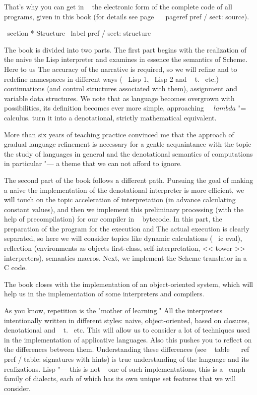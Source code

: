That's why you can get in ~ the electronic form of the complete code of all programs,
given in this book (for details see page ~ \ pageref {pref / sect: source}).


\ section * {Structure} \ label {pref / sect: structure}

The book is divided into two parts. The first part begins with the realization of the naive
the Lisp interpreter and examines in essence the semantics of Scheme. Here to us
The accuracy of the narrative is required, so we will refine and
to redefine namespaces in different ways ( \ Lisp 1, \ Lisp 2 and ~ t. \, etc.)
continuations (and control structures associated with them), assignment and
variable data structures. We note that as
language becomes overgrown with possibilities, its definition becomes ever more simple,
approaching ~ $ \ lambda $ "= calculus.
turn it into a denotational, strictly mathematical equivalent.

More than six years of teaching practice convinced me that
the approach of gradual language refinement is necessary for a gentle acquaintance with the topic
the study of languages ​​in general and the denotational semantics of computations in particular
"--- a theme that we can not afford to ignore.

The second part of the book follows a different path. Pursuing the goal of making a naive
the implementation of the denotational interpreter is more efficient, we will touch on the topic
acceleration of interpretation (in advance calculating constant values), and then
we implement this preliminary processing (with the help of precompilation) for our
compiler in ~ bytecode. In this part, the preparation of the program for the execution and
The actual execution is clearly separated, so here we will consider
topics like dynamic calculations ( \ ic {eval}), reflection (environments as objects
first-class, self-interpretation, << tower >> interpreters), semantics
macros. Next, we implement the Scheme translator in a ~ C code.

The book closes with the implementation of an object-oriented system, which
will help us in the implementation of some interpreters and compilers.

As you know, repetition is the "mother of learning." All the interpreters
intentionally written in different styles: naive, object-oriented,
based on closures, denotational and ~ t. \, etc. This will allow us to consider
a lot of techniques used in the implementation of applicative languages. Also this
pushes you to reflect on the differences between them. Understanding these differences
(see ~ table ~ \ ref {pref / table: signatures} with hints) is true
understanding of the language and its realizations. Lisp "--- this is not ~ one of such implementations,
this is a \ emph {family} of dialects, each of which has its own unique set
features that we will consider.

